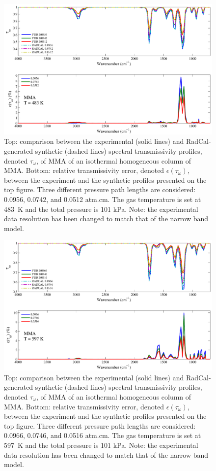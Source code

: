 \begin{figure}[p]
\includegraphics[width=\textwidth]{../Verification/Results_Test2/MMA_483.pdf}
\caption{Top: comparison between the experimental (solid lines) and RadCal-generated synthetic (dashed lines) spectral transmissivity profiles, denoted $\tau_{\omega}$, of MMA of an isothermal homogeneous column of MMA. Bottom: relative transmissivity error, denoted $\epsilon{(\tau_{\omega})}$, between the experiment and the synthetic profiles presented on the top figure. Three different pressure path lengths are considered: 0.0956, 0.0742, and 0.0512 atm.cm. The gas temperature is set at 483~K and the total pressure is 101 kPa. Note: the experimental data resolution has been changed to match that of the narrow band model. \label{fig:MMA_Verify_483K}}
\end{figure}

\begin{figure}[p]
\includegraphics[width=\textwidth]{../Verification/Results_Test2/MMA_597.pdf}
\caption{Top: comparison between the experimental (solid lines) and RadCal-generated synthetic (dashed lines) spectral transmissivity profiles, denoted $\tau_{\omega}$, of MMA of an isothermal homogeneous column of MMA. Bottom: relative transmissivity error, denoted $\epsilon{(\tau_{\omega})}$, between the experiment and the synthetic profiles presented on the top figure. Three different pressure path lengths are considered: 0.0966, 0.0746, and 0.0516 atm.cm. The gas temperature is set at 597~K and the total pressure is 101 kPa. Note: the experimental data resolution has been changed to match that of the narrow band model. \label{fig:MMA_Verify_597K}}
\end{figure}

